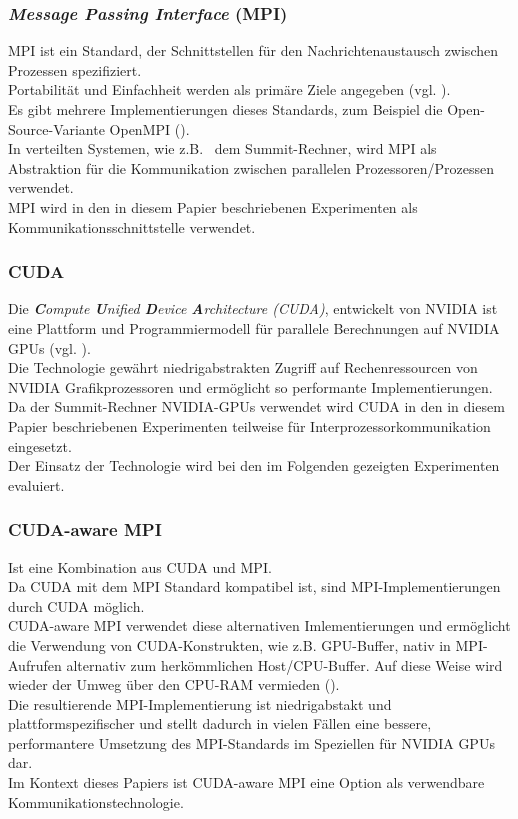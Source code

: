 \subsubsection{ \textit{Message Passing Interface} (MPI) }
MPI ist ein Standard, der Schnittstellen für den Nachrichtenaustausch zwischen Prozessen spezifiziert.\\
Portabilität und Einfachheit werden als primäre Ziele angegeben (vgl. \cite[Kap. 1.1]{mpi}).\\
Es gibt mehrere Implementierungen dieses Standards, zum Beispiel die Open-Source-Variante OpenMPI (\cite{openmpi}).\\
In verteilten Systemen, wie z.B.~ dem Summit-Rechner, wird MPI als Abstraktion für die Kommunikation zwischen parallelen Prozessoren/Prozessen verwendet.\\
MPI wird in den in diesem Papier beschriebenen Experimenten als Kommunikationsschnittstelle verwendet.

\subsubsection{ CUDA }
Die \textit{\textbf{C}ompute \textbf{U}nified \textbf{D}evice \textbf{A}rchitecture (CUDA)}, entwickelt von NVIDIA ist eine Plattform und Programmiermodell für parallele Berechnungen auf NVIDIA GPUs (vgl. \cite{cuda}).\\
Die Technologie gewährt niedrigabstrakten Zugriff auf Rechenressourcen von NVIDIA Grafikprozessoren und ermöglicht so performante Implementierungen.\\
Da der Summit-Rechner NVIDIA-GPUs verwendet wird CUDA in den in diesem Papier beschriebenen Experimenten teilweise für Interprozessorkommunikation eingesetzt.\\
Der Einsatz der Technologie wird bei den im Folgenden gezeigten Experimenten evaluiert.


\subsubsection{ CUDA-aware MPI }
Ist eine Kombination aus CUDA und MPI.\\
Da CUDA mit dem MPI Standard kompatibel ist, sind MPI-Implementierungen durch CUDA möglich.\\
CUDA-aware MPI verwendet diese alternativen Imlementierungen und ermöglicht die Verwendung von CUDA-Konstrukten, wie z.B. GPU-Buffer, nativ in MPI-Aufrufen alternativ zum herkömmlichen Host/CPU-Buffer. Auf diese Weise wird wieder der Umweg über den CPU-RAM vermieden (\cite{cudampi}).\\
Die resultierende MPI-Implementierung ist niedrigabstakt und plattformspezifischer und stellt dadurch in vielen Fällen eine bessere, performantere Umsetzung des MPI-Standards im Speziellen für NVIDIA GPUs dar.\\
Im Kontext dieses Papiers ist CUDA-aware MPI eine Option als verwendbare Kommunikationstechnologie.

